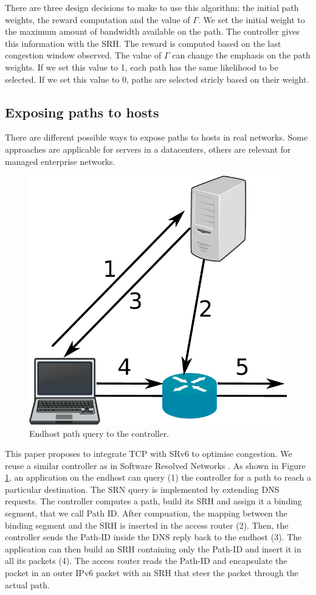 There are three design decisions to make to use this algorithm: the initial path weights, the reward computation and the value of $\Gamma$.
We set the initial weight to the maximum amount of bandwidth available on the path.
The controller gives this information with the SRH.
The reward is computed based on the last congestion window observed.
The value of $\Gamma$ can change the emphasis on the path weights.
If we set this value to 1, each path has the same likelihood to be selected.
If we set this value to 0, paths are selected stricly based on their weight.

\subsection{Exposing paths to hosts}

There are different possible ways to expose paths to hosts in real networks.
Some approaches are applicable for servers in a datacenters, others are
relevant for managed enterprise networks. 


\begin{figure}
	\centering
	\includegraphics[width=0.5\columnwidth]{figs/controller_communication.pdf}
	\caption{Endhost path query to the controller.}
	\label{fig:path-injection}
\end{figure}

This paper proposes to integrate TCP with SRv6 to optimise congestion.
We reuse a similar controller as in Software Resolved Networks \cite{srn}.
As shown in Figure \ref{fig:path-injection}, an application on the endhost
can query (1) the controller for a path to reach a particular destination.
The SRN query is implemented by extending DNS requests.
The controller computes a path, build its SRH and assign it a binding segment,
that we call Path ID.
After compuation, the mapping between the binding segment and the SRH is inserted
in the access router (2). Then, the controller sends the Path-ID inside the DNS reply
back to the endhost (3). The application can then build an SRH containing only the Path-ID
and insert it in all its packets (4). The access router reads the Path-ID and encapsulate
the packet in an outer IPv6 packet with an SRH that steer the packet through the actual path.

